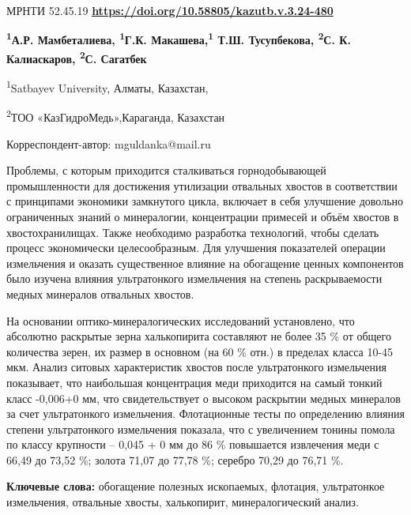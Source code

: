 \newpage
МРНТИ 52.45.19
\hfill {\bfseries \href{https://doi.org/10.58805/kazutb.v.3.24-480}{https://doi.org/10.58805/kazutb.v.3.24-480}}


\begin{center}
{\bfseries \textsuperscript{1}А.Р. Мамбеталиева, \textsuperscript{1}Г.К. Макашева\envelope,\textsuperscript{1} Т.Ш. Тусупбекова, \textsuperscript{2}С. К. Калиаскаров, \textsuperscript{2}С. Сагатбек}

\textsuperscript{1}Satbayev University, Алматы, Казахстан,

\textsuperscript{2}ТОО «КазГидроМедь»,Караганда, Казахстан
\end{center}
\envelope Корреспондент-автор: mguldanka@mail.ru


Проблемы, с которым приходится сталкиваться горнодобывающей
промышленности для достижения утилизации отвальных хвостов в
соответствии с принципами экономики замкнутого цикла, включает в себя
улучшение довольно ограниченных знаний о минералогии, концентрации
примесей и объём хвостов в хвостохранилищах. Также необходимо разработка
технологий, чтобы сделать процесс экономически целесообразным. Для
улучшения показателей операции измельчения и оказать существенное
влияние на обогащение ценных компонентов было изучена влияния
ультратонкого измельчения на степень раскрываемости медных минералов
отвальных хвостов.

На основании оптико-минералогических исследований установлено, что
абсолютно раскрытые зерна халькопирита составляют не более 35 \% от
общего количества зерен, их размер в основном (на 60 \% отн.) в пределах
класса 10-45 мкм. Анализ ситовых характеристик хвостов после
ультратонкого измельчения показывает, что наибольшая концентрация меди
приходится на самый тонкий класс -0,006+0 мм, что свидетельствует о
высоком раскрытии медных минералов за счет ультратонкого измельчения.
Флотационные тесты по определению влияния степени ультратонкого
измельчения показала, что с увеличением тонины помола по классу
крупности -- 0,045 + 0 мм до 86 \% повышается извлечения меди с 66,49 до
73,52 \%; золота 71,07 до 77,78 \%; серебро 70,29 до 76,71 \%.

{\bfseries Ключевые слова:} обогащение полезных ископаемых, флотация,
ультратонкое измельчения, отвальные хвосты, халькопирит,
минералогический анализ.

